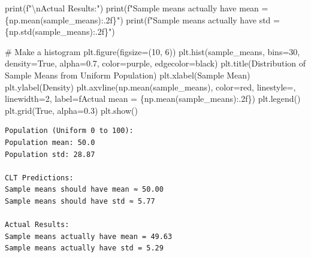 \documentclass[
  letterpaper,
  DIV=11,
  numbers=noendperiod]{scrartcl}
\newenvironment{Shaded}{\begin{snugshade}}{\end{snugshade}}
\newcommand{\BuiltInTok}[1]{\textcolor[rgb]{0.00,0.23,0.31}{#1}}
\newcommand{\CharTok}[1]{\textcolor[rgb]{0.13,0.47,0.30}{#1}}
\newcommand{\CommentTok}[1]{\textcolor[rgb]{0.37,0.37,0.37}{#1}}
\newcommand{\DecValTok}[1]{\textcolor[rgb]{0.68,0.00,0.00}{#1}}
\newcommand{\FloatTok}[1]{\textcolor[rgb]{0.68,0.00,0.00}{#1}}
\newcommand{\NormalTok}[1]{\textcolor[rgb]{0.00,0.23,0.31}{#1}}
\newcommand{\OperatorTok}[1]{\textcolor[rgb]{0.37,0.37,0.37}{#1}}
\newcommand{\SpecialCharTok}[1]{\textcolor[rgb]{0.37,0.37,0.37}{#1}}
\newcommand{\SpecialStringTok}[1]{\textcolor[rgb]{0.13,0.47,0.30}{#1}}
\newcommand{\StringTok}[1]{\textcolor[rgb]{0.13,0.47,0.30}{#1}}
\newcommand{\VariableTok}[1]{\textcolor[rgb]{0.07,0.07,0.07}{#1}}
\begin{document}
\begin{Shaded}
\begin{Highlighting}[]
\BuiltInTok{print}\NormalTok{(}\SpecialStringTok{f"}\CharTok{\textbackslash{}n}\SpecialStringTok{Actual Results:"}\NormalTok{)}
\BuiltInTok{print}\NormalTok{(}\SpecialStringTok{f"Sample means actually have mean = }\SpecialCharTok{\{}\NormalTok{np}\SpecialCharTok{.}\NormalTok{mean(sample\_means)}\SpecialCharTok{:.2f\}}\SpecialStringTok{"}\NormalTok{)}
\BuiltInTok{print}\NormalTok{(}\SpecialStringTok{f"Sample means actually have std = }\SpecialCharTok{\{}\NormalTok{np}\SpecialCharTok{.}\NormalTok{std(sample\_means)}\SpecialCharTok{:.2f\}}\SpecialStringTok{"}\NormalTok{)}

\CommentTok{\# Make a histogram}
\NormalTok{plt.figure(figsize}\OperatorTok{=}\NormalTok{(}\DecValTok{10}\NormalTok{, }\DecValTok{6}\NormalTok{))}
\NormalTok{plt.hist(sample\_means, bins}\OperatorTok{=}\DecValTok{30}\NormalTok{, density}\OperatorTok{=}\VariableTok{True}\NormalTok{, alpha}\OperatorTok{=}\FloatTok{0.7}\NormalTok{, color}\OperatorTok{=}\StringTok{\textquotesingle{}purple\textquotesingle{}}\NormalTok{, edgecolor}\OperatorTok{=}\StringTok{\textquotesingle{}black\textquotesingle{}}\NormalTok{)}
\NormalTok{plt.title(}\StringTok{\textquotesingle{}Distribution of Sample Means from Uniform Population\textquotesingle{}}\NormalTok{)}
\NormalTok{plt.xlabel(}\StringTok{\textquotesingle{}Sample Mean\textquotesingle{}}\NormalTok{)}
\NormalTok{plt.ylabel(}\StringTok{\textquotesingle{}Density\textquotesingle{}}\NormalTok{)}
\NormalTok{plt.axvline(np.mean(sample\_means), color}\OperatorTok{=}\StringTok{\textquotesingle{}red\textquotesingle{}}\NormalTok{, linestyle}\OperatorTok{=}\StringTok{\textquotesingle{}{-}{-}\textquotesingle{}}\NormalTok{, linewidth}\OperatorTok{=}\DecValTok{2}\NormalTok{, }
\NormalTok{           label}\OperatorTok{=}\SpecialStringTok{f\textquotesingle{}Actual mean = }\SpecialCharTok{\{}\NormalTok{np}\SpecialCharTok{.}\NormalTok{mean(sample\_means)}\SpecialCharTok{:.2f\}}\SpecialStringTok{\textquotesingle{}}\NormalTok{)}
\NormalTok{plt.legend()}
\NormalTok{plt.grid(}\VariableTok{True}\NormalTok{, alpha}\OperatorTok{=}\FloatTok{0.3}\NormalTok{)}
\NormalTok{plt.show()}
\end{Highlighting}
\end{Shaded}

\begin{verbatim}
Population (Uniform 0 to 100):
Population mean: 50.0
Population std: 28.87

CLT Predictions:
Sample means should have mean ≈ 50.00
Sample means should have std ≈ 5.77

Actual Results:
Sample means actually have mean = 49.63
Sample means actually have std = 5.29
\end{verbatim}
\end{document}
